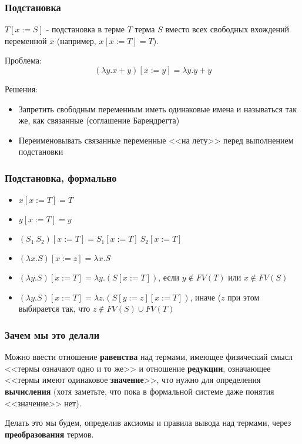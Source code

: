 \documentclass[xetex,mathserif,serif]{beamer}
\begin{document}
	\begin{frame}
		\frametitle{Подстановка}
		$T[x := S]$ - подстановка в терме $T$ терма $S$ вместо всех свободных вхождений 
		переменной $x$ (например, $x[x := T] = T$).
		
		Проблема:
		$$(\lambda y.x + y)[x := y] = \lambda y. y + y$$
		
		Решения:
		\begin{itemize}
			\item Запретить свободным переменным иметь одинаковые имена и называться так же, 
					как связанные (соглашение Барендрегта)
			\item Переименовывать связанные переменные <<на лету>> перед выполнением подстановки
		\end{itemize}		
	\end{frame}
	
	\begin{frame}
		\frametitle{Подстановка, формально}
		\begin{itemize}
			\item $x[x := T] = T$
			\item $y[x := T] = y$
			\item $(S_1\ S_2)[x := T] = S_1[x := T]\ S_2[x := T]$
			\item $(\lambda x.S)[x := z] = \lambda x.S$
			\item $(\lambda y.S)[x := T] = \lambda y.(S[x := T])$, если $y \notin FV(T)$ или $x \notin FV(S)$
			\item $(\lambda y.S)[x := T] = \lambda z.(S[y := z][x := T])$, иначе ($z$ при этом выбирается так, 
					что $z \notin FV(S) \cup FV(T)$
		\end{itemize}		
	\end{frame}
		
	\begin{frame}
		\frametitle{Зачем мы это делали}
		Можно ввести отношение \textbf{равенства} над термами, имеющее физический смысл 
		<<термы означают одно и то же>> и отношение \textbf{редукции}, означающее <<термы имеют 
		одинаковое \textbf{значение}>>, что нужно для определения \textbf{вычисления} (хотя заметьте, что пока в
		формальной системе даже понятия <<значение>> нет).
		
		Делать это мы будем, определив аксиомы и правила вывода над термами, через \textbf{преобразования}
		термов.
	\end{frame}
		
\end{document}
